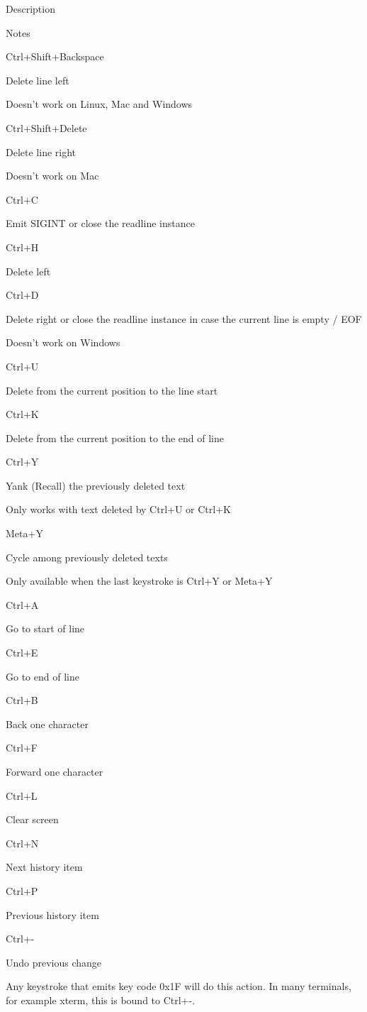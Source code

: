 Description

Notes

Ctrl+Shift+Backspace

Delete line left

Doesn't work on Linux, Mac and Windows

Ctrl+Shift+Delete

Delete line right

Doesn't work on Mac

Ctrl+C

Emit SIGINT or close the readline instance

Ctrl+H

Delete left

Ctrl+D

Delete right or close the readline instance in case the current line is
empty / EOF

Doesn't work on Windows

Ctrl+U

Delete from the current position to the line start

Ctrl+K

Delete from the current position to the end of line

Ctrl+Y

Yank (Recall) the previously deleted text

Only works with text deleted by Ctrl+U or Ctrl+K

Meta+Y

Cycle among previously deleted texts

Only available when the last keystroke is Ctrl+Y or Meta+Y

Ctrl+A

Go to start of line

Ctrl+E

Go to end of line

Ctrl+B

Back one character

Ctrl+F

Forward one character

Ctrl+L

Clear screen

Ctrl+N

Next history item

Ctrl+P

Previous history item

Ctrl+-

Undo previous change

Any keystroke that emits key code 0x1F will do this action. In many
terminals, for example xterm, this is bound to Ctrl+-.

